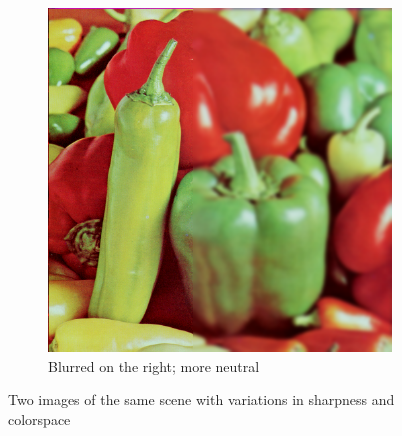 \documentclass{article}
\begin{document}
\begin{figure}
\begin{subfigure}[b]{0.45\textwidth}
		\includegraphics[width=\textwidth]{figures/peppers/peppers_blur_right}
		\caption{Blurred on the right; more neutral}
	\end{subfigure}
	\caption{Two images of the same scene with variations in sharpness and colorspace}
	\label{fig_peppers_lr}
\end{figure}
\end{document}
